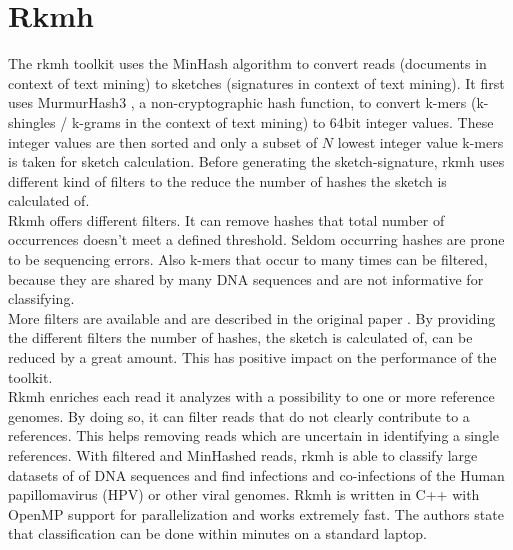 \section{Rkmh}

The rkmh toolkit uses the MinHash algorithm to convert reads (documents in context of text mining) to sketches (signatures in context of text mining). It first uses MurmurHash3 \cite{murmurHash}, a non-cryptographic hash function, to convert k-mers (k-shingles / k-grams in the context of text mining) to 64bit integer values. These integer values are then sorted and only a subset of $ N $ lowest integer value k-mers is taken for sketch calculation.  Before generating the sketch-signature, rkmh uses different kind of filters to the reduce the number of hashes the sketch is calculated of.\\

Rkmh offers different filters. It can remove hashes that total number of occurrences doesn't meet a defined threshold. Seldom occurring hashes are prone to be sequencing errors. Also k-mers that occur to many times can be filtered, because they are shared by many DNA sequences and are not informative for classifying.\\

More filters are available and are described in the original paper \cite{rkmh}. By providing the different filters the number of hashes, the sketch is calculated of, can be reduced by a great amount. This has positive impact on the performance of the toolkit.\\

Rkmh enriches each read it analyzes with a possibility to one or more reference genomes. By doing so, it can filter reads that do not clearly contribute to a references. This helps removing reads which are uncertain in identifying a single references. With filtered and MinHashed reads, rkmh is able to classify large datasets of of DNA sequences and find infections and co-infections of the Human papillomavirus (HPV) or other viral genomes. Rkmh is written in C++ with OpenMP \cite{openMP} support for parallelization and works extremely fast. The authors state that classification can be done within minutes on a standard laptop.
